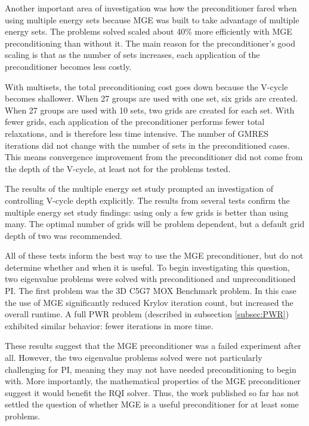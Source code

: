 \documentclass{article}                                                                           %
\begin{document}
Another important area of investigation was how the preconditioner fared when using multiple energy sets because MGE was built to take advantage of multiple energy sets. The problems solved scaled about 40\% more efficiently with MGE preconditioning than without it. The main reason for the preconditioner's good scaling is that as the number of sets increases, each application of the preconditioner becomes less costly. 

With multisets, the total preconditioning cost goes down because the V-cycle becomes shallower. When 27 groups are used with one set, six grids are created. When 27 groups are used with 10 sets, two grids are created for each set. With fewer grids, each application of the preconditioner performs fewer total relaxations, and is therefore less time intensive. The number of GMRES iterations did not change with the number of sets in the preconditioned cases. This means convergence improvement from the preconditioner did not come from the depth of the V-cycle, at least not for the problems tested.

The results of the multiple energy set study prompted an investigation of controlling V-cycle depth explicitly. The results from several tests confirm the multiple energy set study findings: using only a few grids is better than using many. The optimal number of grids will be problem dependent, but a default grid depth of two was recommended.

All of these tests inform the best way to use the MGE preconditioner, but do not determine whether and when it is useful. To begin investigating this question, two eigenvalue problems were solved with preconditioned and unpreconditioned PI. The first problem was the 3D C5G7 MOX Benchmark problem. In this case the use of MGE significantly reduced Krylov iteration count, but increased the overall runtime. A full PWR problem (described in subsection \ref{subsec:PWR}) exhibited similar behavior: fewer iterations in more time. 

These results suggest that the MGE preconditioner was a failed experiment after all. However, the two eigenvalue problems solved were not particularly challenging for PI, meaning they may not have needed preconditioning to begin with. More importantly, the mathematical properties of the MGE preconditioner suggest it would benefit the RQI solver. Thus, the work published so far has not settled the question of whether MGE is a useful preconditioner for at least some problems. 

\end{document}
